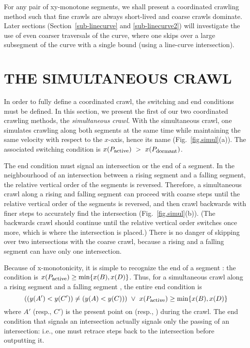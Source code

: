 For any pair of xy-monotone segments, we shall present a coordinated crawling method such 
that fine crawls are always short-lived and coarse crawls dominate.
Later sections (Section~\ref{sub-linecurve} and \ref{sub-linecurve2}) will investigate the use 
of even coarser traversals of the curve, where one skips over a large subsegment of the curve 
with a single bound (using a line-curve intersection).

\section{THE SIMULTANEOUS CRAWL}
\label{sec-simul}

In order to fully define a coordinated crawl, the switching and end conditions must be defined.
In this section, we present the first of our two coordinated crawling methods, the 
{\em simultaneous crawl}.
With the simultaneous crawl, one simulates crawling along both 
segments at the same time while maintaining the same velocity with respect to the $x$-axis,
hence its name (Fig.~\ref{fig.simul}(a)).
The associated switching condition is 
$ x(P_{\mbox{\footnotesize{active}}})\ >\ x(P_{\mbox{\footnotesize{dormant}}}) $.


The end condition must signal an intersection or the end of a segment.
In the neighbourhood of an intersection between a rising segment and a falling segment, 
the relative vertical order of the segments is reversed.
Therefore, a simultaneous crawl along a rising and falling segment can proceed with coarse steps 
until the relative vertical order of the segments is reversed, and then crawl backwards
with finer steps to accurately find the intersection 
(Fig.~\ref{fig.simul}(b)).
(The backwards
	crawl should continue until the relative vertical order switches once more, which 
	is where the intersection is placed.)
There is no danger of skipping over two intersections with the coarse crawl, because
a rising and a falling segment can have only one intersection.

Because of x-monotonicity, it is simple to recognize the end of a segment : 
the condition is $x(P_{\mbox{\footnotesize{active}}}) \geq \mbox{min} \{x(B),x(D)\}$.
Thus, for a simultaneous crawl along a rising segment  and a falling segment ,
the entire end condition is 
\[ ((y(A') < y(C')) \neq (y(A) < y(C))) \ \vee \ 
x(P_{\mbox{\footnotesize{active}}}) \geq \mbox{min} \{x(B),x(D)\} \]
where $A'$ (resp., $C'$) is the present point on \arc{AB} (resp., ) during the crawl.
The end condition that signals an intersection actually signals only the passing of an 
intersection: i.e., one must retrace steps back to the intersection before outputting it.

